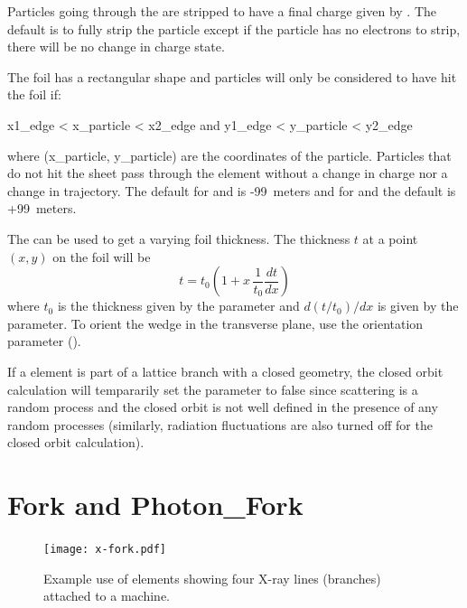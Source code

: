 Particles going through the  are stripped to have a final charge given by
.  The default is to fully strip the particle except if the particle has no
electrons to strip, there will be no change in charge state.

The foil has a rectangular shape and particles will only be considered to have hit the foil if:
\begin{example}
  x1_edge < x_particle < x2_edge  and
  y1_edge < y_particle < y2_edge
\end{example}
where (x_particle, y_particle) are the coordinates of the particle. Particles that do not hit the
sheet pass through the element without a change in charge nor a change in trajectory. The default
for  and  is -99~meters and for  and  the default is
+99~meters.

The  can be used to get a varying foil thickness. The thickness $t$ at a point
$(x,y)$ on the foil will be
\begin{equation}
  t = t_0 (1 + x \, \frac{1}{t_0}\frac{dt}{dx})
\end{equation}
where $t_0$ is the thickness given by the  parameter and $d(t/t_0)/dx$ is given by the
 parameter. To orient the wedge in the transverse plane, use the  orientation
parameter ().

If a  element is part of a lattice branch with a closed geometry, the closed orbit
calculation will tempararily set the  parameter to false since scattering is a random
process and the closed orbit is not well defined in the presence of any random processes (similarly,
radiation fluctuations are also turned off for the closed orbit calculation).

\newpage

\section{Fork and Photon_Fork}
\label{s:fork}

\begin{figure}[tb]
  \centering
  \texttt{[image: x-fork.pdf]}
  \caption[Example with photon_fork elements.]
  {
Example use of  elements showing four X-ray lines (branches) attached to a machine.
  }
  \label{f:x.fork}
\end{figure}

